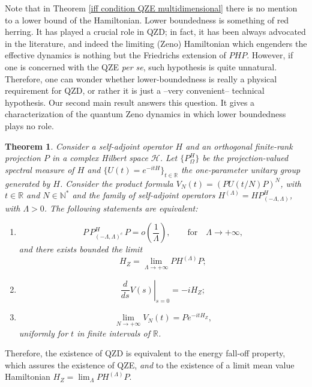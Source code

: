 \documentclass[aip,jmp,12pt
]{revtex4}
\newcommand{\RM}{\mathbb{R}}
\newcommand{\NM}{\mathbb{N}}
\newtheorem{theorem}{Theorem}
\theoremstyle{definition}
\begin{document}
Note that in Theorem \ref{iff condition QZE multidimensional} there is no mention to a lower bound of the Hamiltonian. Lower boundedness is something of red herring.
It has played a crucial role in QZD; in fact, it has been always advocated in the literature, and indeed the limiting (Zeno) Hamiltonian which engenders the effective dynamics is nothing but the Friedrichs extension of $PHP$.
However, if one is concerned with the QZE \textit{per se},
such hypothesis is quite unnatural. Therefore, one can wonder whether lower-boundedness is really a physical requirement for QZD, or rather it is just a --very convenient-- technical hypothesis. Our second main result answers this question. It gives a characterization of the quantum Zeno dynamics in which lower boundedness plays no role.

\begin{theorem}\label{thm:QZE}
Consider  a self-adjoint operator  $H$ and an orthogonal
finite-rank projection $P$ in a complex Hilbert space
$\mathcal{H}$. Let  $\{P_{\Omega}^H\}$ be the projection-valued
spectral measure  of $H$ and $\{U(t)=e^{-itH}\}_{t \in \RM}$ the
one-parameter unitary group generated by $H$. Consider the product
formula
$V_{N}(t)=(PU(t/N)P)^{N}$, with $t \in \RM$ and $N \in \NM^*$ and
 the family of self-adjoint operators $H^{(\Lambda)}=HP^{H}_{(-\Lambda,\Lambda)}$, with $\Lambda > 0$.
The following statements are equivalent:
\begin{enumerate}
    \item \label {thm:QZE_1}
    \begin{equation*}
     P\, P_{(-\Lambda,\Lambda)^c}^H\, P = o\left( \frac{1}{\Lambda} \right), \qquad \mathrm{for} \quad \Lambda \to + \infty,
    \end{equation*}
    and there exists bounded the limit
    $$H_Z=\lim_{\Lambda \to +\infty} PH^{(\Lambda)}P;$$
     \item
      \begin{equation*}
       \left.\frac{d}{ds}V(s)\right|_{s=0}=-iH_{Z};
      \end{equation*}
    \item
    \begin{equation*}
      \lim_{N \to +\infty} V_{N}(t)=Pe^{-itH_{Z}},
    \end{equation*}
    uniformly for $t$ in finite intervals of $\RM$.
\end{enumerate}
\end{theorem}

Therefore,  the existence of QZD is equivalent  to
the energy fall-off property, which assures the existence of QZE, \emph{and}
to the existence of a limit mean value Hamiltonian $H_Z = \lim_\Lambda P H^{(\Lambda)}P$.
\end{document}
